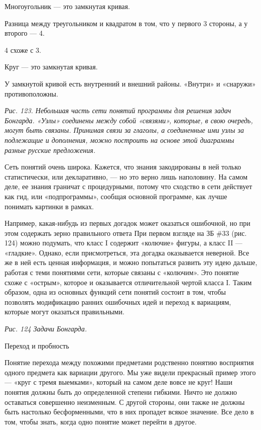 \documentclass[../main.tex]{subfiles}
\begin{document}
Многоугольник --- это замкнутая кривая.

Разница между треугольником и квадратом в том, что у первого 3 стороны, а у второго --- 4.

4 схоже с 3.

Круг --- это замкнутая кривая.

У замкнутой кривой есть внутренний и внешний районы. «Внутри» и «снаружи» противоположны.

\emph{Рис. 123. Небольшая часть сети понятий программы для решения задач Бонгарда. «Узлы» соединены между собой «связями», которые, в свою очередь, могут быть связаны. Принимая связи за глаголы, а соединенные ими узлы за подлежащие и дополнения, можно построить на основе этой диаграммы разные русские предложения.}

Сеть понятий очень широка. Кажется, что знания закодированы в ней только статистически, или декларативно, --- но это верно лишь наполовину. На самом деле, ее знания граничат с процедурными, потому что сходство в сети действует как гид, или «подпрограммы», сообщая основной программе, как лучше понимать картинки в рамках.

Например, какая-нибудь из первых догадок может оказаться ошибочной, но при этом содержать зерно правильного ответа При первом взгляде на ЗБ \#33 (рис. 124) можно подумать, что класс I содержит «колючие» фигуры, а класс II --- «гладкие». Однако, если присмотреться, эта догадка оказывается неверной. Все же в ней есть ценная информация, и можно попытаться развить эту идею дальше, работая с теми понятиями сети, которые связаны с «колючим». Это понятие схоже с «острым», которое и оказывается отличительной чертой класса I. Таким образом, одна из основных функций сети понятий состоит в том, чтобы позволять модификацию ранних ошибочных идей и переход к вариациям, которые могут оказаться правильными.

\emph{Рис. 124 Задачи Бонгарда.}

Переход и пробность

Понятие перехода между похожими предметами родственно понятию восприятия одного предмета как вариации другого. Мы уже видели прекрасный пример этого --- «круг с тремя выемками», который на самом деле вовсе не круг! Наши понятия должны быть до определенной степени гибкими. Ничто не должно оставаться совершенно неизменным. С другой стороны, они также не должны быть настолько бесформенными, что в них пропадет всякое значение. Все дело в том, чтобы знать, когда одно понятие может перейти в другое.
\end{document}
